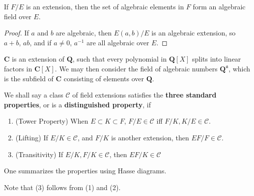 \begin{theorem}
    If $F/E$ is an extension, then the set of algebraic elements in $F$ form an algebraic field over $E$.
\end{theorem}
\begin{proof}
    If $a$ and $b$ are algebraic, then $E(a,b)/E$ is an algebraic extension, so $a + b$, $ab$, and if $a \neq 0$, $a^{-1}$ are all algebraic over $E$.
\end{proof}

\begin{example}
    $\mathbf{C}$ is an extension of $\mathbf{Q}$, such that every polynomial in $\mathbf{Q}[X]$ splits into linear factors in $\mathbf{C}[X]$. We may then consider the field of algebraic numbers $\mathbf{Q}^{\mathfrak{a}}$, which is the subfield of $\mathbf{C}$ consisting of elements over $\mathbf{Q}$.
\end{example}

We shall say a class $\mathcal{C}$ of field extensions satisfies the {\bf three standard properties}, or is a {\bf distinguished property}, if
%
\begin{enumerate}
    \item (Tower Property) When $E \subset K \subset F$, $F/E \in \mathcal{C}$ iff $F/K,K/E \in \mathcal{C}$.
    \item (Lifting) If $E/K \in \mathcal{C}$, and $F/K$ is another extension, then $EF/F \in \mathcal{C}$.
    \item (Transitivity) If $E/K, F/K \in \mathcal{C}$, then $EF/K \in \mathcal{C}$
\end{enumerate}
%
One summarizes the properties using Hasse diagrams.
%
\begin{center}
\end{center}
%
Note that (3) follows from (1) and (2).

